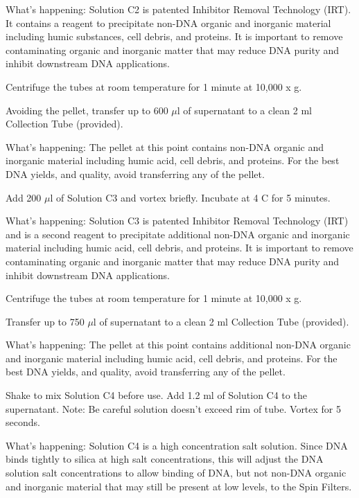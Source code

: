 \documentclass[12pt]{../SOP3_alpha}\usepackage[]{graphicx}\usepackage[]{color}
\begin{document}
What's happening: Solution C2 is patented Inhibitor Removal Technology\textsuperscript{\textregistered} (IRT). It contains a reagent to precipitate non-DNA organic and inorganic material including humic substances, cell debris, and proteins. It is important to remove contaminating organic and inorganic matter that may reduce
DNA purity and inhibit downstream DNA applications.

\NP Centrifuge the tubes at room temperature for 1 minute at 10,000 x g.

\NP Avoiding the pellet, transfer up to 600 $\mu$l of supernatant to a clean 2 ml Collection Tube (provided).

\noindent What's happening: The pellet at this point contains non-DNA organic and inorganic material including humic acid, cell debris, and proteins. For the best DNA yields, and quality, avoid transferring any of the pellet.

\NP Add 200 $\mu$l of Solution C3 and vortex briefly. Incubate at 4 \degree C for 5 minutes.

\noindent What's happening: Solution C3 is patented Inhibitor Removal Technology\textsuperscript{\textregistered} (IRT) and is a second reagent to precipitate additional non-DNA organic and inorganic material including humic acid, cell debris, and proteins. It is important to remove contaminating organic and inorganic matter that may reduce DNA purity and inhibit downstream DNA applications.

\NP Centrifuge the tubes at room temperature for 1 minute at 10,000 x g.

\NP Transfer up to 750 $\mu$l of supernatant to a clean 2 ml Collection Tube (provided).

\noindent What's happening: The pellet at this point contains additional non-DNA organic and inorganic material including humic acid, cell debris, and proteins. For the best DNA yields, and quality, avoid transferring any of the pellet.

\NP Shake to mix Solution C4 before use. Add 1.2 ml of Solution C4 to the supernatant. Note: Be careful solution doesn't exceed rim of tube. Vortex for 5 seconds.

\noindent What's happening: Solution C4 is a high concentration salt solution. Since DNA binds tightly to silica at high salt concentrations, this will adjust the DNA solution salt concentrations to allow binding of DNA, but not non-DNA organic and inorganic material that may still be present at low levels, to the Spin Filters.
\end{document}
